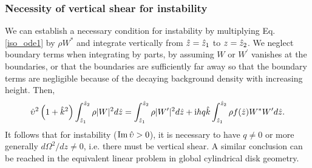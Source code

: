 \subsubsection{Necessity of vertical shear for
  instability}\label{integral_relation} 
We can establish a necessary condition for instability by multiplying
Eq. \ref{iso_ode1} by $\rho W^*$ and integrate vertically from
$\hat{z}=\hat{z}_1$ to $z=\hat{z}_2$. We neglect boundary 
terms when integrating by parts, by assuming $W$ or
$W^\prime$ vanishes at the boundaries, or that the boundaries are 
sufficiently far away so that the boundary terms are negligible because of the
decaying background density with increasing height. Then,
\begin{align}
  \hat{\upsilon}^2\left(1+\hat{k}^2\right)\int_{\hat{z}_1}^{\hat{z}_2}\rho|W|^2d\hat{z}
  =\int_{\hat{z}_1}^{\hat{z}_2}\rho|W^\prime|^2d\hat{z} 
  +\mathrm{i} h q \hat{k}\int_{\hat{z}_1}^{\hat{z}_2}\rho f(\hat{z}) W^*W^\prime d\hat{z}.\label{integral_relation1}
\end{align}
It follows that for instability ($\operatorname{Im}\hat{\upsilon}>0$), it is necessary to
have $q\neq0$ or more generally $d\Omega^2/dz\neq 0$, i.e. there must
be vertical shear. A similar conclusion can be reached in the
equivalent linear problem in global cylindrical disk geometry.  


